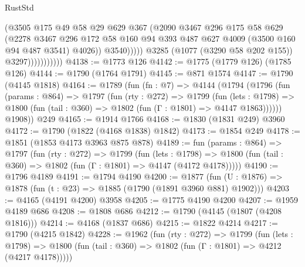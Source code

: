 \begin{lexlean}{RustStd}
\begin{coremodule}
                                  (@3505
                                    @175
                                    @49
                                    @58
                                    @29
                                    @629
                                    @367
                                    (@2090
                                      @3467
                                      @296
                                      @175
                                      @58
                                      @629
                                      (@2278
                                        @3467
                                        @296
                                        @172
                                        @58
                                        @160
                                        @94
                                        @393
                                        @487
                                        @627
                                        @4009
                                        (@3500 @160 @94 @487 @3541)
                                        @4026))
                                    @3540)))))
                          @3285
                          (@1077 (@3290 @58 @202 @155))
                          @3297)))))))))))
@4138 := @1773 @126
@4142 := @1775 (@1779 @126) (@1785 @126)
@4144 := @1790 (@1764 @1791)
@4145 := @871 @1574
@4147 := @1790 (@4145 @1818)
@4164 := @1789
    (fun (fn : @7) =>
    @4144
      (@1794
        (@1796
          (fun (params : @864) =>
          @1797
            (fun (rty : @272) =>
            @1799
              (fun (lets : @1798) =>
              @1800 (fun (tail : @360) => @1802 (fun (Γ : @1801) => @4147 @1863))))))
        @1908))
    @249
@4165 := @1914 @1766
@4168 := @1830 (@1831 @249) @3960
@4172 := @1790 (@1822 (@4168 @1838) @1842)
@4173 := @1854 @249
@4178 := @1851 (@1853 @4173 @3963 @875 @878)
@4189 := fun (params : @864) =>
  @1797
    (fun (rty : @272) =>
    @1799
      (fun (lets : @1798) =>
      @1800 (fun (tail : @360) => @1802 (fun (Γ : @1801) => @4147 (@4172 @4178)))))
@4190 := @1796 @4189
@4191 := @1794 @4190
@4200 := @1877 (fun (U : @1876) => @1878 (fun (t : @23) => @1885 (@1790 (@1891 @3960 @881) @1902)))
@4203 := @4165 (@4191 @4200) @3958
@4205 := @1775 @4190 @4200
@4207 := @1959 @4189 @686
@4208 := @1808 @686
@4212 := @1790 (@4145 (@1807 (@4208 @1816)))
@4214 := @4168 (@1837 @686)
@4215 := @1822 @4214
@4217 := @1790 (@4215 @1842)
@4228 := @1962
    (fun (rty : @272) =>
    @1799
      (fun (lets : @1798) =>
      @1800 (fun (tail : @360) => @1802 (fun (Γ : @1801) => @4212 (@4217 @4178)))))

\end{coremodule}
\end{lexlean}
